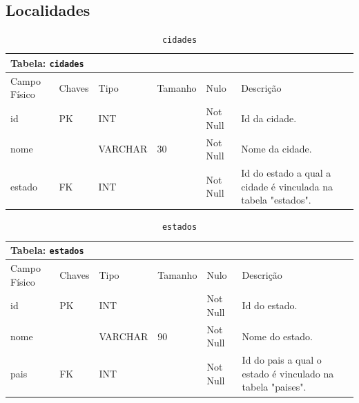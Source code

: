\documentclass[12pt,a4paper]{article}
\begin{document}
\subsection{Localidades}


\begin{center}
\begin{table}[h!]
	\caption{\texttt{cidades}}
	\label{tabela:cidades}
	\begin{tabular}{|p{2.3cm}|p{1.2cm}|p{1.8cm}|p{1.5cm}|p{1cm}|p{6cm}|}\hline		
		\multicolumn{6}{|p{16cm}|}{\cellcolor{cinzaClaro}  \centering Tabela: \texttt{cidades}} \\ \hline %
		{\small Campo Físico}   & {\small Chaves} & {\small Tipo} & {\small Tamanho} & {\small Nulo} & {\small Descrição}\\\hline %
		
		{\tiny id} & {\tiny PK} & {\tiny INT} & {\tiny } & {\tiny Not Null} &{\tiny Id da cidade.}\\\hline
		{\tiny nome} & {\tiny } & {\tiny VARCHAR} & {\tiny 30} & {\tiny Not Null} &{\tiny Nome da cidade.}\\\hline
		{\tiny estado} & {\tiny FK} & {\tiny INT} & {\tiny } & {\tiny Not Null} &{\tiny Id do estado a qual a cidade é vinculada na tabela "estados".}\\\hline
		
			
	\end{tabular}
\end{table}	
\end{center}

\begin{center}
\begin{table}[h!]
	\caption{\texttt{estados}}
	\label{tabela:estados}
	\begin{tabular}{|p{2.3cm}|p{1.2cm}|p{1.8cm}|p{1.5cm}|p{1cm}|p{6cm}|}\hline		
		\multicolumn{6}{|p{16cm}|}{\cellcolor{cinzaClaro}  \centering Tabela: \texttt{estados}} \\ \hline %
		{\small Campo Físico}   & {\small Chaves} & {\small Tipo} & {\small Tamanho} & {\small Nulo} & {\small Descrição}\\\hline %
		
		{\tiny id} & {\tiny PK} & {\tiny INT} & {\tiny } & {\tiny Not Null} &{\tiny Id do estado.}\\\hline
		{\tiny nome} & {\tiny } & {\tiny VARCHAR} & {\tiny 90} & {\tiny Not Null} &{\tiny Nome do estado.}\\\hline
		{\tiny pais} & {\tiny FK} & {\tiny INT} & {\tiny } & {\tiny Not Null} &{\tiny Id do pais a qual o estado é vinculado na tabela "paises".}\\\hline
			
	\end{tabular}
\end{table}	
\end{center}
\end{document}
